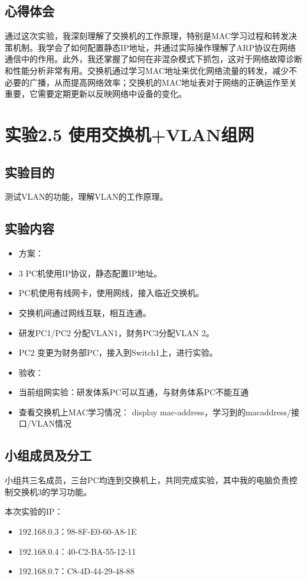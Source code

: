 \documentclass{article}
\begin{document}
\subsection{心得体会}
通过这次实验，我深刻理解了交换机的工作原理，特别是MAC学习过程和转发决策机制。我学会了如何配置静态IP地址，并通过实际操作理解了ARP协议在网络通信中的作用。此外，我还掌握了如何在非混杂模式下抓包，这对于网络故障诊断和性能分析非常有用。交换机通过学习MAC地址来优化网络流量的转发，减少不必要的广播，从而提高网络效率；交换机的MAC地址表对于网络的正确运作至关重要，它需要定期更新以反映网络中设备的变化。


\newpage\section{实验2.5 使用交换机+VLAN组网}
\subsection{实验目的}
测试VLAN的功能，理解VLAN的工作原理。
\subsection{实验内容}
\begin{itemize}
    \item 方案：
    \item 3 PC机使用IP协议，静态配置IP地址。
    \item PC机使用有线网卡，使用网线，接入临近交换机。
    \item 交换机间通过网线互联，相互连通。
    \item 研发PC1/PC2 分配VLAN1，财务PC3分配VLAN 2。
    \item PC2 变更为财务部PC，接入到Switch1上，进行实验。
    \item 验收：
    \item 当前组网实验：研发体系PC可以互通，与财务体系PC不能互通
    \item 查看交换机上MAC学习情况： display mac-address，学习到的macaddress/接口/VLAN情况
\end{itemize}
\subsection{小组成员及分工}
小组共三名成员，三台PC均连到交换机上，共同完成实验，其中我的电脑负责控制交换机3的学习功能。

本次实验的IP：
\begin{itemize}
    \item 192.168.0.3：98-8F-E0-60-A8-1E
    \item 192.168.0.4：40-C2-BA-55-12-11
    \item 192.168.0.7：C8-4D-44-29-48-88
\end{itemize}
\end{document}
